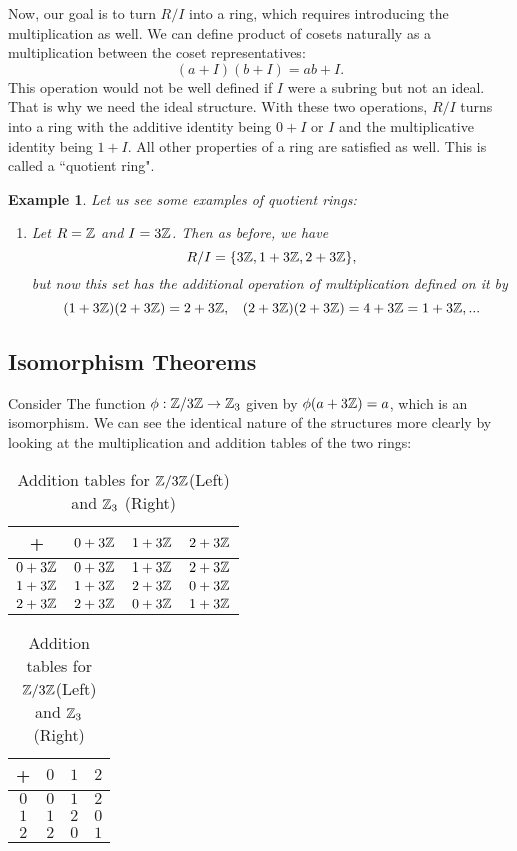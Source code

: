\documentclass[12pt]{article}
\theoremstyle{plain}
\newtheorem{example}{Example}
\theoremstyle{definition}
\theoremstyle{remark}
\begin{document}
Now, our goal is to turn $R/I$ into a ring, which requires introducing the multiplication as well. We can define product of cosets naturally as a multiplication between the coset representatives:
\begin{equation}
    (a+I)(b+I)=ab+I.
\end{equation}
This operation would not be well defined if $I$ were a subring but not an ideal. That is why we need the ideal structure. With these two operations, $R/I$ turns into a ring with the additive identity being $0+I$ or $I$ and the multiplicative identity being $1+I$. All other properties of a ring are satisfied as well. This is called a ``quotient ring".

\begin{example}
Let us see some examples of quotient rings:
\begin{enumerate}
    \item Let $R=\mathbb{Z}$ and $I=3\mathbb{Z}$. Then as before, we have
    $$R/I = \{3\mathbb{Z}, 1+3\mathbb{Z}, 2+3\mathbb{Z}\},$$
    but now this set has the additional operation of multiplication defined on it by
    $$(1+3\mathbb{Z})(2+3\mathbb{Z})=2+3\mathbb{Z}, \:\:\:\: (2+3\mathbb{Z})(2+3\mathbb{Z}) = 4+3\mathbb{Z}=1+3\mathbb{Z}, ...$$
\end{enumerate}
\end{example}

\subsection{Isomorphism Theorems}
Consider The function $\phi:\mathbb{Z}/3\mathbb{Z}\rightarrow \mathbb{Z}_3$ given by $\phi(a+3\mathbb{Z})=a$, which is an isomorphism. We can see the identical nature of the structures more clearly by looking at the multiplication and addition tables of the two rings:
\begin{table}[H]
\qquad \quad \quad \quad
\begin{tabular}{ c| c | c | c}
+ & $0+3\mathbb{Z}$ & $1+3\mathbb{Z}$ & $2+3\mathbb{Z}$ \\
\hline
$0+3\mathbb{Z}$ & $0+3\mathbb{Z}$ & $1+3\mathbb{Z}$ & $2+3\mathbb{Z}$  \\
\hline
$1+3\mathbb{Z}$ & $1+3\mathbb{Z}$ & $2+3\mathbb{Z}$ & $0+3\mathbb{Z}$  \\
\hline
$2+3\mathbb{Z}$ & $2+3\mathbb{Z}$ & $0+3\mathbb{Z}$ & $1+3\mathbb{Z}$ \\
\hline
\end{tabular}
\quad \quad \quad \quad \quad \quad \quad \quad \quad
\begin{tabular}{ c| c | c | c}
+ & $0$ & $1$ & $2$ \\
\hline
$0$ & $0$ & $1$ & $2$  \\
\hline
$1$ & $1$ & $2$ & $0$  \\
\hline
$2$ & $2$ & $0$ & $1$ \\
\hline
\end{tabular}

\caption{Addition tables for $\mathbb{Z}/3\mathbb{Z}$(Left) and $\mathbb{Z}_3$ (Right)}
\end{table}
\end{document}
